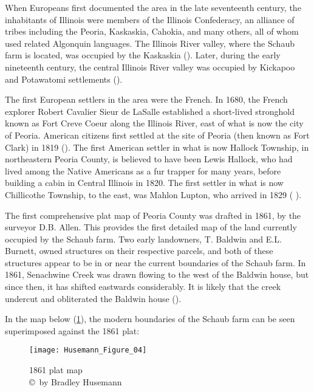 When Europeans first documented the area in the late seventeenth century, the inhabitants of Illinois were members of the Illinois Confederacy, an alliance of tribes including the Peoria, Kaskaskia, Cahokia, and many others, all of whom used related Algonquin languages. The Illinois River valley, where the Schaub farm is located, was occupied by the Kaskaskia (\cite{murphree2012}). Later, during the early nineteenth century, the central Illinois River valley was occupied by Kickapoo and Potawatomi settlements (\cite{wagner2013}).

The first European settlers in the area were the French. In 1680, the French explorer Robert Cavalier Sieur de LaSalle established a short-lived stronghold known as Fort Creve Coeur along the Illinois River, east of what is now the city of Peoria. American citizens first settled at the site of Peoria (then known as Fort Clark) in 1819 (\cite{mcculloch1902}). The first American settler in what is now Hallock Township, in northeastern Peoria County, is believed to have been Lewis Hallock, who had lived among the Native Americans as a fur trapper for many years, before building a cabin in Central Illinois in 1820. The first settler in what is now Chillicothe Township, to the east, was Mahlon Lupton, who arrived in 1829 (\cite{history} %
).

The first comprehensive plat map of Peoria County was drafted in 1861, by the surveyor D.B. Allen. This provides the first detailed map of the land currently occupied by the Schaub farm. Two early landowners, T. Baldwin and E.L. Burnett, owned structures on their respective parcels, and both of these structures appear to be in or near the current boundaries of the Schaub farm. In 1861, Senachwine Creek was drawn flowing to the west of the Baldwin house, but since then, it has shifted eastwards considerably. It is likely that the creek undercut and obliterated the Baldwin house (\cite{allen1861}).

In the map below (\cref{fig:Husemann_Figure_04}), the modern boundaries of the Schaub farm can be seen superimposed against the 1861 plat:

\begin{figure}[!htb]
	\texttt{[image: Husemann\_Figure\_04]}
	\caption{1861 plat map
		{\normalfont\scriptsize \\ \copyright\ by Bradley Husemann
	}}
	\label{fig:Husemann_Figure_04}
\end{figure}

